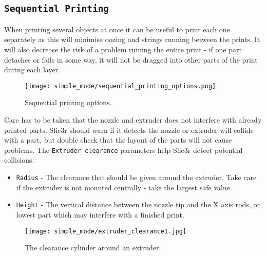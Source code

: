 
\subsection{\texttt{Sequential Printing}} %
\label{sec:sequential_printing}

When printing several objects at once it can be useful to print each one separately as this will minimise oozing and strings running between the prints.  It will also decrease the risk of a problem ruining the entire print - if one part detaches or fails in some way, it will not be dragged into other parts of the print during each layer.

\begin{figure}[H]
\centering
\texttt{[image: simple\_mode/sequential\_printing\_options.png]}
\caption{Sequential printing options.}
\label{fig:sequential_printing_options}
\end{figure}

Care has to be taken that the nozzle and extruder does not interfere with already printed parts.  Slic3r should warn if it detects the nozzle or extruder will collide with a part, but double check that the layout of the parts will not cause problems.  The \texttt{Extruder clearance} parameters help Slic3r detect potential collisions:
\begin{itemize}
	\item \texttt{Radius}  - The clearance that should be given around the extruder.  Take care if the extruder is not mounted centrally - take the largest safe value.
	\item \texttt{Height}  - The vertical distance between the nozzle tip and the X axis rods, or lowest part which may interfere with a finished print.
\end{itemize}

\begin{figure}[H]
\centering
\texttt{[image: simple\_mode/extruder\_clearance1.jpg]}
\caption{The clearance cylinder around an extruder.}
\label{fig:a_diagram_depicting_extruder_clearance}
\end{figure}

